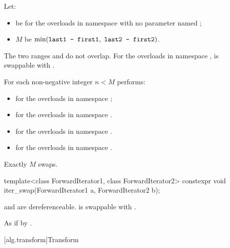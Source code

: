 \begin{itemdescr}
\pnum
Let:
\begin{itemize}
\item
   be 
  for the overloads in namespace 
  with no parameter named ;
\item $M$ be $\min(\tcode{last1 - first1}, \ \tcode{last2 - first2})$.
\end{itemize}

\pnum
\expects
The two ranges  and 
do not overlap.
For the overloads in namespace ,
 is swappable with
.

\pnum
\effects
For each non-negative integer $n < M$ performs:
\begin{itemize}
\item
  for the overloads in namespace ;
\item
  for the overloads in namespace .
\end{itemize}

\pnum
\returns
\begin{itemize}
\item
  for the overloads in namespace .
\item
  for the overloads in namespace .
\end{itemize}

\pnum
\complexity
Exactly $M$ swaps.
\end{itemdescr}

%
\begin{itemdecl}
template<class ForwardIterator1, class ForwardIterator2>
  constexpr void iter_swap(ForwardIterator1 a, ForwardIterator2 b);
\end{itemdecl}

\begin{itemdescr}
\pnum
\expects
{} and  are dereferenceable.  is
swappable with .

\pnum
\effects
As if by .
\end{itemdescr}

[alg.transform]{Transform}


